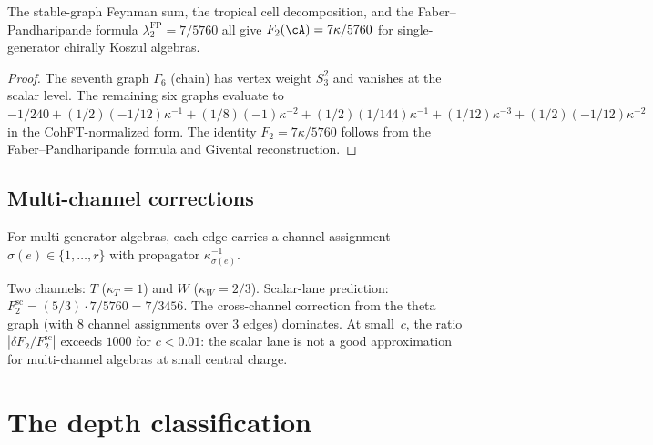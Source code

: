 \begin{theorem}
\label{thm:comp-genus2-cross}
\ClaimStatusProvedHere
The stable-graph Feynman sum, the tropical cell decomposition,
and the Faber--Pandharipande formula
$\lambda_2^{\mathrm{FP}} = 7/5760$ all give
$F_2(\cA) = 7\kappa/5760$ for single-generator chirally Koszul
algebras.
\end{theorem}

\begin{proof}
The seventh graph $\Gamma_6$ (chain) has vertex weight
$S_3^2$ and vanishes at the scalar level. The remaining
six graphs evaluate to
$-1/240 + (1/2)(-1/12)\kappa^{-1}
+ (1/8)(-1)\kappa^{-2} + (1/2)(1/144)\kappa^{-1}
+ (1/12)\kappa^{-3} + (1/2)(-1/12)\kappa^{-2}$
in the CohFT-normalized form. The identity
$F_2 = 7\kappa/5760$ follows from the Faber--Pandharipande
formula and Givental reconstruction.
\end{proof}


\subsection{Multi-channel corrections}
\label{subsec:comp-multichannel}

For multi-generator algebras, each edge carries a channel
assignment $\sigma(e) \in \{1, \ldots, r\}$ with propagator
$\kappa_{\sigma(e)}^{-1}$.

\begin{example}[$\cW_3$ at $c = 2$]
\label{ex:comp-w3-cross-channel}
Two channels: $T$ ($\kappa_T = 1$) and $W$
($\kappa_W = 2/3$). Scalar-lane prediction:
$F_2^{\mathrm{sc}} = (5/3) \cdot 7/5760 = 7/3456$.
The cross-channel correction from the theta graph (with $8$
channel assignments over $3$ edges) dominates. At small~$c$,
the ratio $|\delta F_2 / F_2^{\mathrm{sc}}|$ exceeds $1000$
for $c < 0.01$: the scalar lane is not a good approximation
for multi-channel algebras at small central charge.
\end{example}


\section{The depth classification}
\label{sec:comp-depth-classification}

